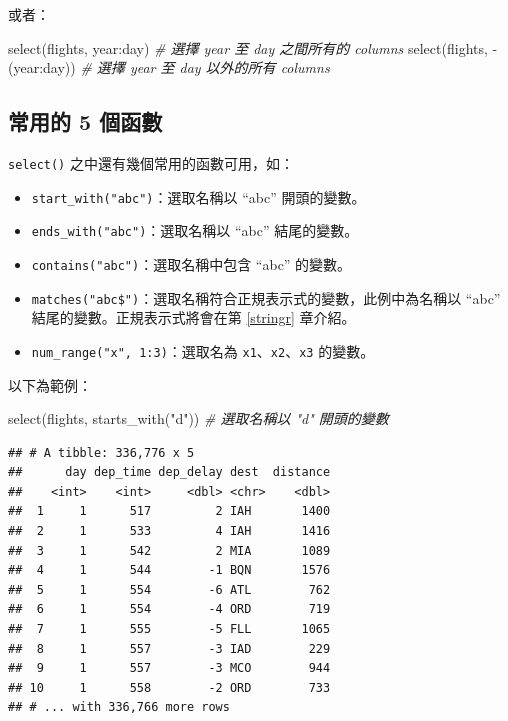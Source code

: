 \documentclass[
]{book}
\newenvironment{Shaded}{\begin{snugshade}}{\end{snugshade}}
\newcommand{\CommentTok}[1]{\textcolor[rgb]{0.56,0.35,0.01}{\textit{#1}}}
\newcommand{\FunctionTok}[1]{\textcolor[rgb]{0.00,0.00,0.00}{#1}}
\newcommand{\NormalTok}[1]{#1}
\newcommand{\SpecialCharTok}[1]{\textcolor[rgb]{0.00,0.00,0.00}{#1}}
\newcommand{\StringTok}[1]{\textcolor[rgb]{0.31,0.60,0.02}{#1}}
\theoremstyle{definition}
\theoremstyle{remark}
\begin{document}
或者：

\begin{Shaded}
\begin{Highlighting}[]
\FunctionTok{select}\NormalTok{(flights, year}\SpecialCharTok{:}\NormalTok{day)  }\CommentTok{\# 選擇 year 至 day 之間所有的 columns}
\FunctionTok{select}\NormalTok{(flights, }\SpecialCharTok{{-}}\NormalTok{(year}\SpecialCharTok{:}\NormalTok{day))  }\CommentTok{\# 選擇 year 至 day 以外的所有 columns}
\end{Highlighting}
\end{Shaded}

\hypertarget{ux5e38ux7528ux7684-5-ux500bux51fdux6578}{%
\subsection{常用的 5 個函數}\label{ux5e38ux7528ux7684-5-ux500bux51fdux6578}}

\texttt{select()} 之中還有幾個常用的函數可用，如：

\begin{itemize}
\item
  \texttt{start\_with("abc")}：選取名稱以 ``abc'' 開頭的變數。
\item
  \texttt{ends\_with("abc")}：選取名稱以 ``abc'' 結尾的變數。
\item
  \texttt{contains("abc")}：選取名稱中包含 ``abc'' 的變數。
\item
  \texttt{matches("abc\$")}：選取名稱符合正規表示式的變數，此例中為名稱以 ``abc'' 結尾的變數。正規表示式將會在第 \ref{stringr} 章介紹。
\item
  \texttt{num\_range("x",\ 1:3)}：選取名為 \texttt{x1}、\texttt{x2}、\texttt{x3} 的變數。
\end{itemize}

以下為範例：

\begin{Shaded}
\begin{Highlighting}[]
\FunctionTok{select}\NormalTok{(flights, }\FunctionTok{starts\_with}\NormalTok{(}\StringTok{"d"}\NormalTok{))  }\CommentTok{\# 選取名稱以 "d" 開頭的變數}
\end{Highlighting}
\end{Shaded}

\begin{verbatim}
## # A tibble: 336,776 x 5
##      day dep_time dep_delay dest  distance
##    <int>    <int>     <dbl> <chr>    <dbl>
##  1     1      517         2 IAH       1400
##  2     1      533         4 IAH       1416
##  3     1      542         2 MIA       1089
##  4     1      544        -1 BQN       1576
##  5     1      554        -6 ATL        762
##  6     1      554        -4 ORD        719
##  7     1      555        -5 FLL       1065
##  8     1      557        -3 IAD        229
##  9     1      557        -3 MCO        944
## 10     1      558        -2 ORD        733
## # ... with 336,766 more rows
\end{verbatim}
\end{document}
